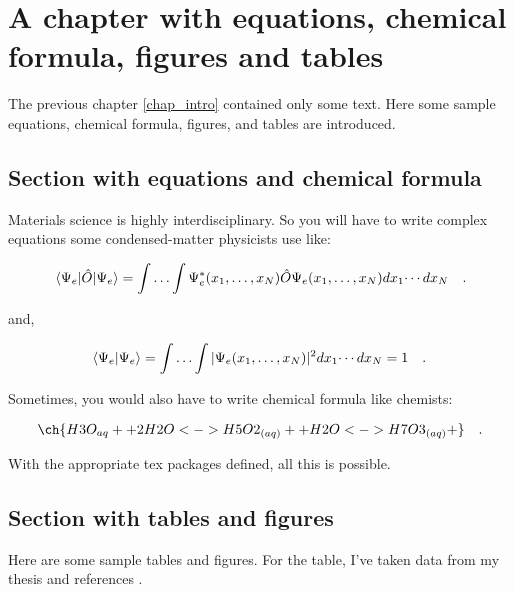 \chapter{A chapter with equations, chemical formula, figures and tables}
\label{chap_main}

The previous chapter \ref{chap_intro} contained only some text. Here some sample
equations, chemical formula, figures, and tables
are introduced.

\section{Section with equations and chemical formula}
\label{sec_eq_fig_tab}

Materials science is highly interdisciplinary. So you will have to write complex
equations some condensed-matter physicists use like:

\begin{equation}
\expval{\hat{O}}{\Psi_e} = \int \dotsc \int \Psi_e^{*}(x_1,\dotsc,x_N) \hat{O}
\Psi_e(x_1,\dotsc ,x_N)  dx_1 \dotsi dx_N
\quad .
\label{main_eq1}
\end{equation}

and,

\begin{equation}
\braket{\Psi_e} = \int \dotsc \int |\Psi_e (x_1,\dotsc,x_N)|^2  dx_1\dotsi dx_N = 1
\quad .
\label{main_eq2}
\end{equation}

Sometimes, you would also have to write chemical formula like chemists:

\begin{equation}
\centering
\ch{H3O_{aq}+ + 2 H2O <-> H5O2_{(aq)}+ + H2O <-> H7O3_{(aq)}+} \quad .
\label{main_eq3}
\end{equation}

With the appropriate tex packages defined, all this is possible.

\section{Section with tables and figures}
\label{sec_tab_figs}

Here are some sample tables and figures. For the table, I've taken data from my
thesis and references \cite{Singh-miller2009, Sakong2018, Kittel1976, Salmeron1983}.

